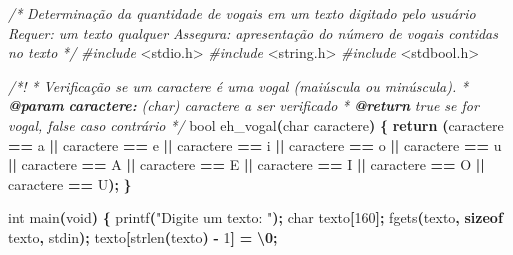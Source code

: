 \documentclass[
  11pt,
  a4paper,
]{scrbook}
\newenvironment{Shaded}{\begin{snugshade}}{\end{snugshade}}
\newcommand{\AnnotationTok}[1]{\textcolor[rgb]{0.56,0.35,0.01}{\textbf{\textit{#1}}}}
\newcommand{\CharTok}[1]{\textcolor[rgb]{0.31,0.60,0.02}{#1}}
\newcommand{\CommentTok}[1]{\textcolor[rgb]{0.56,0.35,0.01}{\textit{#1}}}
\newcommand{\CommentVarTok}[1]{\textcolor[rgb]{0.56,0.35,0.01}{\textbf{\textit{#1}}}}
\newcommand{\ControlFlowTok}[1]{\textcolor[rgb]{0.13,0.29,0.53}{\textbf{#1}}}
\newcommand{\DataTypeTok}[1]{\textcolor[rgb]{0.13,0.29,0.53}{#1}}
\newcommand{\DecValTok}[1]{\textcolor[rgb]{0.00,0.00,0.81}{#1}}
\newcommand{\ImportTok}[1]{#1}
\newcommand{\KeywordTok}[1]{\textcolor[rgb]{0.13,0.29,0.53}{\textbf{#1}}}
\newcommand{\NormalTok}[1]{#1}
\newcommand{\OperatorTok}[1]{\textcolor[rgb]{0.81,0.36,0.00}{\textbf{#1}}}
\newcommand{\PreprocessorTok}[1]{\textcolor[rgb]{0.56,0.35,0.01}{\textit{#1}}}
\newcommand{\SpecialCharTok}[1]{\textcolor[rgb]{0.81,0.36,0.00}{\textbf{#1}}}
\newcommand{\StringTok}[1]{\textcolor[rgb]{0.31,0.60,0.02}{#1}}
\begin{document}
\begin{Shaded}
\begin{Highlighting}[]
\CommentTok{/*}
\CommentTok{Determinação da quantidade de vogais em um texto digitado pelo usuário}
\CommentTok{Requer: um texto qualquer}
\CommentTok{Assegura: apresentação do número de vogais contidas no texto}
\CommentTok{*/}
\PreprocessorTok{\#include }\ImportTok{\textless{}stdio.h\textgreater{}}
\PreprocessorTok{\#include }\ImportTok{\textless{}string.h\textgreater{}}
\PreprocessorTok{\#include }\ImportTok{\textless{}stdbool.h\textgreater{}}

\CommentTok{/*!}
\CommentTok{ * Verificação se um caractere é uma vogal (maiúscula ou minúscula).}
\CommentTok{ * }\AnnotationTok{@param}\CommentTok{ }\CommentVarTok{caractere:}\CommentTok{ (char) caractere a ser verificado}
\CommentTok{ * }\AnnotationTok{@return}\CommentTok{ true se for vogal, false caso contrário}
\CommentTok{ */}
\DataTypeTok{bool}\NormalTok{ eh\_vogal}\OperatorTok{(}\DataTypeTok{char}\NormalTok{ caractere}\OperatorTok{)} \OperatorTok{\{}
    \ControlFlowTok{return} \OperatorTok{(}\NormalTok{caractere }\OperatorTok{==} \CharTok{\textquotesingle{}a\textquotesingle{}} \OperatorTok{||}\NormalTok{ caractere }\OperatorTok{==} \CharTok{\textquotesingle{}e\textquotesingle{}} \OperatorTok{||}\NormalTok{ caractere }\OperatorTok{==} \CharTok{\textquotesingle{}i\textquotesingle{}} \OperatorTok{||}
\NormalTok{            caractere }\OperatorTok{==} \CharTok{\textquotesingle{}o\textquotesingle{}} \OperatorTok{||}\NormalTok{ caractere }\OperatorTok{==} \CharTok{\textquotesingle{}u\textquotesingle{}} \OperatorTok{||}\NormalTok{ caractere }\OperatorTok{==} \CharTok{\textquotesingle{}A\textquotesingle{}} \OperatorTok{||}
\NormalTok{            caractere }\OperatorTok{==} \CharTok{\textquotesingle{}E\textquotesingle{}} \OperatorTok{||}\NormalTok{ caractere }\OperatorTok{==} \CharTok{\textquotesingle{}I\textquotesingle{}} \OperatorTok{||}\NormalTok{ caractere }\OperatorTok{==} \CharTok{\textquotesingle{}O\textquotesingle{}} \OperatorTok{||}
\NormalTok{            caractere }\OperatorTok{==} \CharTok{\textquotesingle{}U\textquotesingle{}}\OperatorTok{);}
\OperatorTok{\}}

\DataTypeTok{int}\NormalTok{ main}\OperatorTok{(}\DataTypeTok{void}\OperatorTok{)} \OperatorTok{\{}
\NormalTok{    printf}\OperatorTok{(}\StringTok{"Digite um texto: "}\OperatorTok{);}
    \DataTypeTok{char}\NormalTok{ texto}\OperatorTok{[}\DecValTok{160}\OperatorTok{];}
\NormalTok{    fgets}\OperatorTok{(}\NormalTok{texto}\OperatorTok{,} \KeywordTok{sizeof}\NormalTok{ texto}\OperatorTok{,}\NormalTok{ stdin}\OperatorTok{);}
\NormalTok{    texto}\OperatorTok{[}\NormalTok{strlen}\OperatorTok{(}\NormalTok{texto}\OperatorTok{)} \OperatorTok{{-}} \DecValTok{1}\OperatorTok{]} \OperatorTok{=} \CharTok{\textquotesingle{}}\SpecialCharTok{\textbackslash{}0}\CharTok{\textquotesingle{}}\OperatorTok{;}


\end{Highlighting}
\end{Shaded}
\end{document}
